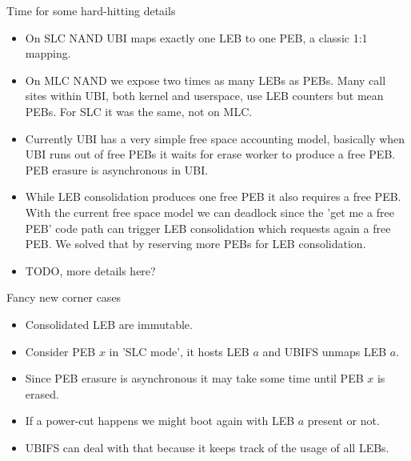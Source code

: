 \documentclass[aspectratio=169,obeyspaces,spaces,hyphens,dvipsnames]{beamer}
\begin{document}
\begin{frame}{Time for some hard-hitting details}
  \begin{itemize}
  \item On SLC NAND UBI maps exactly one LEB to one PEB, a classic 1:1 mapping.
  \item On MLC NAND we expose two times as many LEBs as PEBs. Many call sites within UBI,
        both kernel and userspace, use LEB counters but mean PEBs. For SLC it was the same,
        not on MLC.
  \item Currently UBI has a very simple free space accounting model, basically when UBI runs out of
        free PEBs it waits for erase worker to produce a free PEB. PEB erasure is asynchronous in UBI.
  \item While LEB consolidation produces one free PEB it also requires a free PEB. With the current free space
        model we can deadlock since the 'get me a free PEB' code path can trigger LEB consolidation which
        requests again a free PEB. We solved that by reserving more PEBs for LEB consolidation. 
  \item TODO, more details here?
  \end{itemize}
\end{frame}

\begin{frame}{Fancy new corner cases}
  \begin{itemize}
  \item Consolidated LEB are immutable.
  \item Consider PEB $x$ in 'SLC mode', it hosts LEB $a$ and UBIFS unmaps LEB $a$.
  \item Since PEB erasure is asynchronous it may take some time until PEB $x$ is erased.
  \item If a power-cut happens we might boot again with LEB $a$ present or not.
  \item UBIFS can deal with that because it keeps track of the usage of all LEBs.
  \end{itemize}
\end{frame}
\end{document}
